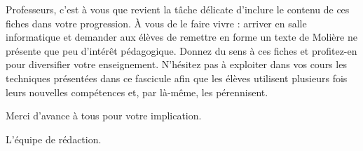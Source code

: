 \vspace{18pt}

Professeurs, c'est à vous que revient la tâche délicate d'inclure le contenu de ces fiches dans votre progression. À vous de le faire vivre : arriver en salle informatique et demander aux élèves de remettre en forme un texte de Molière ne présente que peu d'intérêt pédagogique. Donnez du sens à ces fiches et profitez-en pour diversifier votre enseignement. N'hésitez pas à exploiter dans vos cours les techniques présentées dans ce fascicule afin que les élèves utilisent plusieurs fois leurs nouvelles compétences et, par là-même, les pérennisent.



\vspace{18pt}

Merci d'avance à tous pour votre implication.

\vspace{18pt}

L'équipe de rédaction.

\vspace{2cm}


  
